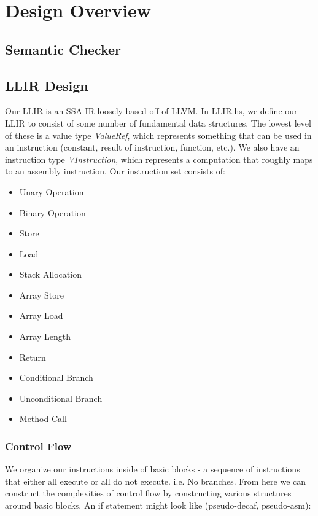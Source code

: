 \documentclass[11pt]{article}
\begin{document}
\section{Design Overview}

\subsection{Semantic Checker}

\subsection{LLIR Design}

\par Our LLIR is an SSA IR loosely-based off of LLVM. In LLIR.hs, we define our LLIR to consist of some number of fundamental data structures. The lowest level of these is a value type {\it ValueRef}, which represents something that can be used in an instruction (constant, result of instruction, function, etc.). We also have an instruction type {\it VInstruction}, which represents a computation that roughly maps to an assembly instruction. Our instruction set consists of:

\begin{itemize}
    \item Unary Operation
    \item Binary Operation
    \item Store
    \item Load
    \item Stack Allocation
    \item Array Store
    \item Array Load
    \item Array Length
    \item Return
    \item Conditional Branch
    \item Unconditional Branch
    \item Method Call
\end{itemize}

\subsubsection{Control Flow}

\par We organize our instructions inside of basic blocks - a sequence of instructions that either all execute or all do not execute. i.e. No branches. From here we can construct the complexities of control flow by constructing various structures around basic blocks. An if statement might look like (pseudo-decaf, pseudo-asm):
\end{document}
